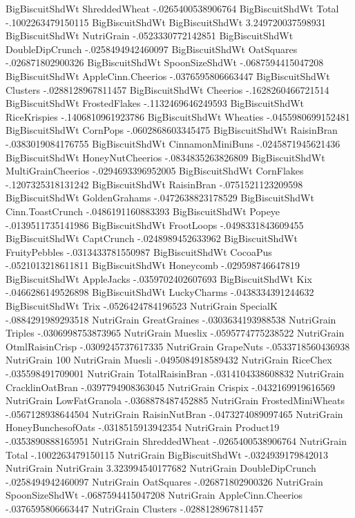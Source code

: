 BigBiscuitShdWt	ShreddedWheat	-.0265400538906764
BigBiscuitShdWt	Total	-.1002263479150115
BigBiscuitShdWt	BigBiscuitShdWt	3.249720037598931
BigBiscuitShdWt	NutriGrain	-.0523330772142851
BigBiscuitShdWt	DoubleDipCrunch	-.0258494942460097
BigBiscuitShdWt	OatSquares	-.026871802900326
BigBiscuitShdWt	SpoonSizeShdWt	-.0687594415047208
BigBiscuitShdWt	AppleCinn.Cheerios	-.0376595806663447
BigBiscuitShdWt	Clusters	-.0288128967811457
BigBiscuitShdWt	Cheerios	-.1628260466721514
BigBiscuitShdWt	FrostedFlakes	-.1132469646249593
BigBiscuitShdWt	RiceKrispies	-.1406810961923786
BigBiscuitShdWt	Wheaties	-.0455980699152481
BigBiscuitShdWt	CornPops	-.0602868603345475
BigBiscuitShdWt	RaisinBran	-.0383019084176755
BigBiscuitShdWt	CinnamonMiniBuns	-.0245871945621436
BigBiscuitShdWt	HoneyNutCheerios	-.0834835263826809
BigBiscuitShdWt	MultiGrainCheerios	-.0294693396952005
BigBiscuitShdWt	CornFlakes	-.1207325318131242
BigBiscuitShdWt	RaisinBran	-.0751521123209598
BigBiscuitShdWt	GoldenGrahams	-.0472638823178529
BigBiscuitShdWt	Cinn.ToastCrunch	-.0486191160883393
BigBiscuitShdWt	Popeye	-.0139511735141986
BigBiscuitShdWt	FrootLoops	-.0498331843609455
BigBiscuitShdWt	CaptCrunch	-.0248989452633962
BigBiscuitShdWt	FruityPebbles	-.0313433781550987
BigBiscuitShdWt	CocoaPus	-.0521013218611811
BigBiscuitShdWt	Honeycomb	-.029598746647819
BigBiscuitShdWt	AppleJacks	-.0359702402607693
BigBiscuitShdWt	Kix	-.0466286149526898
BigBiscuitShdWt	LuckyCharms	-.0438334391244632
BigBiscuitShdWt	Trix	-.0526424784196523
NutriGrain	SpecialK	-.0884291989293518
NutriGrain	GreatGraines	-.0303634193988538
NutriGrain	Triples	-.0306998753873965
NutriGrain	Mueslix	-.0595774775238522
NutriGrain	OtmlRaisinCrisp	-.0309245737617335
NutriGrain	GrapeNuts	-.0533718560436938
NutriGrain	100%
NutriGrain	Muesli	-.0495084918589432
NutriGrain	RiceChex	-.035598491709001
NutriGrain	TotalRaisinBran	-.0314104338608832
NutriGrain	CracklinOatBran	-.0397794908363045
NutriGrain	Crispix	-.0432169919616569
NutriGrain	LowFatGranola	-.0368878487452885
NutriGrain	FrostedMiniWheats	-.0567128938644504
NutriGrain	RaisinNutBran	-.0473274089097465
NutriGrain	HoneyBunchesofOats	-.0318515913942354
NutriGrain	Product19	-.0353890888165951
NutriGrain	ShreddedWheat	-.0265400538906764
NutriGrain	Total	-.1002263479150115
NutriGrain	BigBiscuitShdWt	-.0324939179842013
NutriGrain	NutriGrain	3.323994540177682
NutriGrain	DoubleDipCrunch	-.0258494942460097
NutriGrain	OatSquares	-.026871802900326
NutriGrain	SpoonSizeShdWt	-.0687594415047208
NutriGrain	AppleCinn.Cheerios	-.0376595806663447
NutriGrain	Clusters	-.0288128967811457
